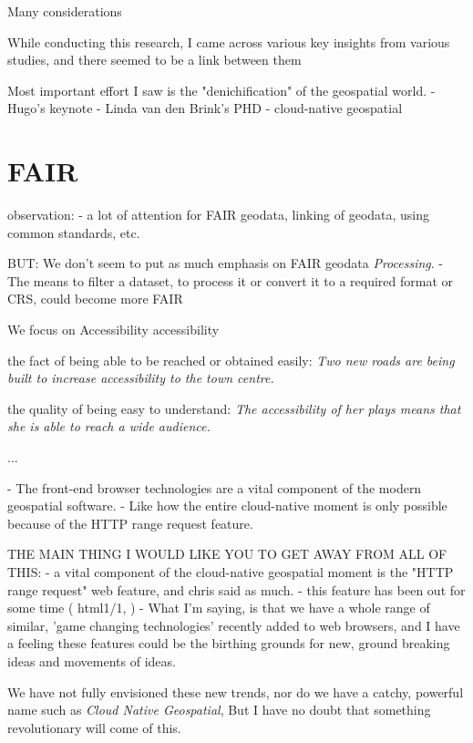 Many considerations


While conducting this research, I came across various key insights from various studies, and there seemed to be a link between them 

Most important effort I saw is the "denichification" of the geospatial world.
- Hugo's keynote
- Linda van den Brink's PHD
- cloud-native geospatial 



\section{FAIR}

observation: 
- a lot of attention for FAIR geodata, linking of geodata, using common standards, etc. 

BUT: We don't seem to put as much emphasis on FAIR geodata \emph{Processing}. 
- The means to filter a dataset, to process it or convert it to a required format or CRS, could become more FAIR

We focus on Accessibility
accessibility

\m{->} the fact of being able to be reached or obtained easily:
\textit{Two new roads are being built to increase accessibility to the town centre.}

\m{->} the quality of being easy to understand: 
\textit{The accessibility of her plays means that she is able to reach a wide audience.}

...

- The front-end browser technologies are a vital component of the modern geospatial software.
- Like how the entire cloud-native moment is only possible because of the HTTP range request feature. 


THE MAIN THING I WOULD LIKE YOU TO GET AWAY FROM ALL OF THIS:
- a vital component of the cloud-native geospatial moment is the "HTTP range request" web feature, and chris said as much.
  - this feature has been out for some time ( html1/1, )
- What I'm saying, is that we have a whole range of similar, 'game changing technologies' recently added to web browsers, and I have a feeling these features could be the birthing grounds for new, ground breaking ideas and movements of ideas. 

We have not fully envisioned these new trends, nor do we have a catchy, powerful name such as \emph{Cloud Native Geospatial}, But I have no doubt that something revolutionary will come of this. 

